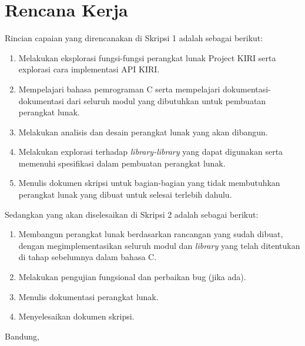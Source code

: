 \documentclass[a4paper,twoside]{article}
\begin{document}
\section{Rencana Kerja}
Rincian capaian yang direncanakan di Skripsi 1 adalah sebagai berikut:
\begin{enumerate}
    \item Melakukan eksplorasi fungsi-fungsi perangkat lunak Project KIRI serta explorasi cara implementasi API KIRI.
	\item Mempelajari bahasa pemrograman C serta mempelajari dokumentasi-dokumentasi dari seluruh modul yang dibutuhkan untuk pembuatan perangkat lunak.
	\item Melakukan analisis dan desain perangkat lunak yang akan dibangun.
	\item Melakukan explorasi terhadap \textit{library-library} yang dapat digunakan serta memenuhi spesifikasi dalam pembuatan perangkat lunak.
	\item Menulis dokumen skripsi untuk bagian-bagian yang tidak membutuhkan perangkat lunak yang dibuat untuk selesai terlebih dahulu.
\end{enumerate}

Sedangkan yang akan diselesaikan di Skripsi 2 adalah sebagai berikut:
\begin{enumerate}
    \item Membangun perangkat lunak berdasarkan rancangan yang sudah dibuat, dengan megimplementasikan seluruh modul dan \textit{library} yang telah ditentukan di tahap sebelumnya dalam bahasa C.
	\item Melakukan pengujian fungsional dan perbaikan bug (jika ada).
	\item Menulis dokumentasi perangkat lunak.
	\item Menyelesaikan dokumen skripsi.
\end{enumerate}

\vspace{1cm}
\centering Bandung, \tanggal\\
\vspace{2cm} \nama \\ 
\vspace{1cm}
\end{document}
